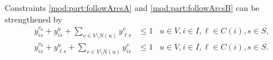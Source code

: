 Constraints \eqref{mod:part:followArcsA} and \eqref{mod:part:followArcsB} can be strengthened by
\begin{subequations}\label{mod:partition}
\begin{align}
\label{mod:part:followArcsAStronger}
y^{v_0}_{is}+y^u_{i s} + \sum\limits_{v\in V\setminus N(u)}y^v_{\ell s}&\leq 1 & u\in V,i\in I,\ell\in C(i), s\in S,  \\
y^{v_0}_{is}+y^u_{\ell s} + \sum\limits_{v\in V\setminus N(u)}y^v_{i s}&\leq 1 & u\in V,i\in I,\ell\in C(i), s\in S. 
\end{align}
\end{subequations}



